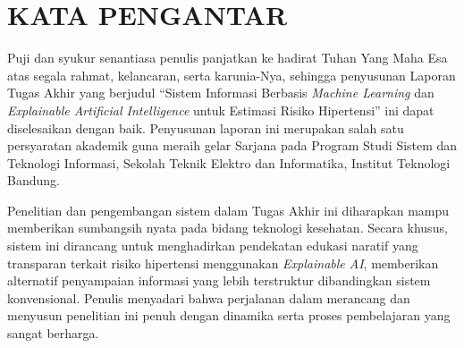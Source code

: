 
    



\chapter*{KATA PENGANTAR}

Puji dan syukur senantiasa penulis panjatkan ke hadirat Tuhan Yang Maha Esa atas segala rahmat, kelancaran, serta karunia-Nya, sehingga penyusunan Laporan Tugas Akhir yang berjudul ``Sistem Informasi Berbasis \textit{Machine Learning} dan \textit{Explainable Artificial Intelligence} untuk Estimasi Risiko Hipertensi'' ini dapat diselesaikan dengan baik. Penyusunan laporan ini merupakan salah satu persyaratan akademik guna meraih gelar Sarjana pada Program Studi Sistem dan Teknologi Informasi, Sekolah Teknik Elektro dan Informatika, Institut Teknologi Bandung.

Penelitian dan pengembangan sistem dalam Tugas Akhir ini diharapkan mampu memberikan sumbangsih nyata pada bidang teknologi kesehatan. Secara khusus, sistem ini dirancang untuk menghadirkan pendekatan edukasi naratif yang transparan terkait risiko hipertensi menggunakan \textit{Explainable AI}, memberikan alternatif penyampaian informasi yang lebih terstruktur dibandingkan sistem konvensional. Penulis menyadari bahwa perjalanan dalam merancang dan menyusun penelitian ini penuh dengan dinamika serta proses pembelajaran yang sangat berharga.

